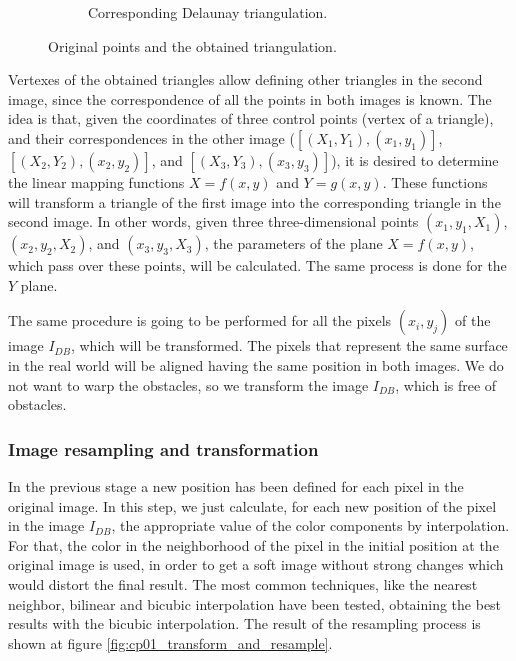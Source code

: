 \begin{figure}[h!]
\begin{subfigure}[b]{0.45\textwidth}
                \caption{Corresponding Delaunay triangulation.}\label{fig:cp01_triangulation_2}
        \end{subfigure}%
        \caption{Original points and the obtained triangulation.}\label{fig:cp01_triangulation}
\end{figure}

Vertexes of the obtained triangles allow defining other triangles in the second image, since the correspondence of all the points in both images is known. The idea is that, given the coordinates of three control points (vertex of a triangle), and their correspondences in the other image ($[(X_1, Y_1), (x_1, y_1)]$, $[(X_2, Y_2), (x_2, y_2)]$, and $[(X_3, Y_3), (x_3, y_3)]$), it is desired to determine the linear mapping functions $X = f(x, y)$ and $Y = g(x, y)$. These functions will transform a triangle of the first image into the corresponding triangle in the second image. In other words, given three three-dimensional points $(x_1, y_1, X_1)$, $(x_2, y_2, X_2)$, and $(x_3, y_3, X_3)$, the parameters of the plane $X = f(x, y)$, which pass over these points, will be calculated. The same process is done for the $Y$ plane.

The same procedure is going to be performed for all the pixels $(x_i, y_j)$ of the image $I_{DB}$, which will be transformed. The pixels that represent the same surface in the real world will be aligned having the same position in both images. We do not want to warp the obstacles, so we transform the image $I_{DB}$, which is free of obstacles.

\subsubsection{Image resampling and transformation}\label{ch:chapter01_01_02_04}

In the previous stage a new position has been defined for each pixel in the original image. In this step, we just calculate, for each new position of the pixel in the image $I_{DB}$, the appropriate value of the color components by interpolation. For that, the color in the neighborhood of the pixel in the initial position at the original image is used, in order to get a soft image without strong changes which would distort the final result. The most common techniques, like the nearest neighbor, bilinear and bicubic interpolation have been tested, obtaining the best results with the bicubic interpolation. The result of the resampling process is shown at figure \ref{fig:cp01_transform_and_resample}.

